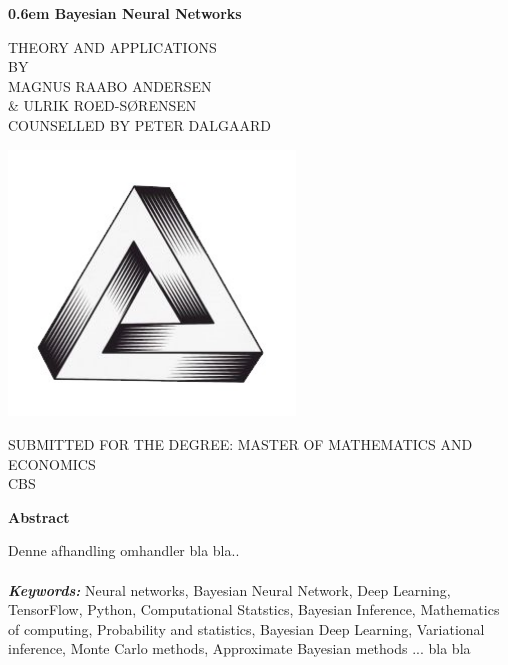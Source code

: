 \documentclass[a4paper]{book}
\providecommand{\keywords}[1]
{
  \small	
  \textbf{\textit{Keywords:}} #1
}
\numberwithin{equation}{section}
\begin{document}
\begin{titlepage}
\clearpage
\newcommand\nbvspace[1][3]{\vspace*{\stretch{#1}}}
\newcommand\nbstretchyspace{\spaceskip0.5em plus 0.25em minus 0.25em}
\newcommand{\nbtitlestretch}{\spaceskip0.6em}
\thispagestyle{empty}
\begin{center}
	\bfseries
	\nbvspace[1]
	\Huge
	{\nbtitlestretch\huge
		Bayesian Neural Networks}
	
	\nbvspace[1]
	\normalsize
	
	THEORY AND APPLICATIONS\\
	\nbvspace[1]
	\small BY\\
	\Large MAGNUS RAABO ANDERSEN \\ \& ULRIK ROED-SØRENSEN\\[0.5em]
	\footnotesize COUNSELLED BY PETER DALGAARD
	
	\nbvspace[2]
	
	\includegraphics[width=3in]{penrose.JPG}
	\nbvspace[3]
	
	SUBMITTED FOR THE DEGREE: MASTER OF MATHEMATICS AND ECONOMICS\\
	\large
	CBS
	\nbvspace[1]
\end{center}
\end{titlepage}

\thispagestyle{empty}
\begin{center}
    \Large
    \textbf{Abstract}
\end{center}
\vspace{0.9cm}
Denne afhandling omhandler bla bla.. %
\\
\\
\keywords{Neural networks, Bayesian Neural Network, Deep Learning, TensorFlow, Python, Computational Statstics, Bayesian Inference, Mathematics of computing, Probability and statistics, Bayesian Deep Learning, Variational inference, Monte Carlo methods, Approximate Bayesian methods ...  bla bla}
\frontmatter
\end{document}
